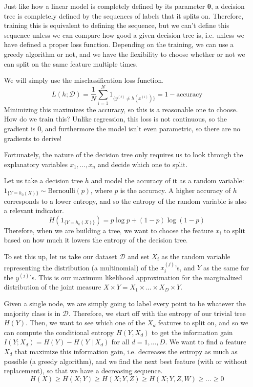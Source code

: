   Just like how a linear model is completely defined by its parameter $\boldsymbol{\theta}$, a decision tree is completely defined by the sequences of labels that it splits on. Therefore, training this is equivalent to defining the sequence, but we can't define this sequence unless we can compare how good a given decision tree is, i.e. unless we have defined a proper loss function. Depending on the training, we can use a greedy algorithm or not, and we have the flexibility to choose whether or not we can split on the same feature multiple times. 

  \begin{definition}
    We will simply use the misclassification loss function. 
    \begin{equation}
      L(h; \mathcal{D}) = \frac{1}{N} \sum_{i=1}^N 1_{\{y^{(i)} \neq h(x^{(i)})\}} = 1 - \text{accuracy}
    \end{equation}
    Minimizing this maximizes the accuracy, so this is a reasonable one to choose. How do we train this? Unlike regression, this loss is not continuous, so the gradient is $0$, and furthermore the model isn't even parametric, so there are no gradients to derive! 
  \end{definition}

  Fortunately, the nature of the decision tree only requires us to look through the explanatory variables $x_1, \ldots, x_n$ and decide which one to split. 

  Let us take a decision tree $h$ and model the accuracy of it as a random variable: $1_{\{Y = h_0 (X)\}} \sim \mathrm{Bernoulli}(p)$, where $p$ is the accuracy. A higher accuracy of $h$ corresponds to a lower entropy, and so the entropy of the random variable is also a relevant indicator. 
  \[H(1_{\{Y = h_0 (X)\}}) = p \log{p} + (1 - p) \log(1 - p)\]
  Therefore, when we are building a tree, we want to choose the feature $x_i$ to split based on how much it lowers the entropy of the decision tree. 

  To set this up, let us take our dataset $\mathcal{D}$ and set $X_i$ as the random variable representing the distribution (a multinomial) of the $x_i^{(j)}$'s, and $Y$ as the same for the $y^{(j)}$'s. This is our maximum likelihood approximation for the marginalized distribution of the joint measure $X \times Y = X_1 \times \ldots \times X_D \times Y$. 

  Given a single node, we are simply going to label every point to be whatever the majority class is in $\mathcal{D}$. Therefore, we start off with the entropy of our trivial tree $H(Y)$. Then, we want to see which one of the $X_d$ features to split on, and so we can compute the conditional entropy $H(Y, X_d)$ to get the information gain $I(Y; X_d) = H(Y) - H(Y \mid X_d)$ for all $d = 1, \ldots, D$. We want to find a feature $X_d$ that maximize this information gain, i.e. decreases the entropy as much as possible (a greedy algorithm), and we find the next best feature (with or without replacement), so that we have a decreasing sequence. 
  \[H(X) \geq H(X ; Y) \geq H(X ; Y, Z) \geq H(X ; Y, Z, W) \geq \ldots \geq 0\]

